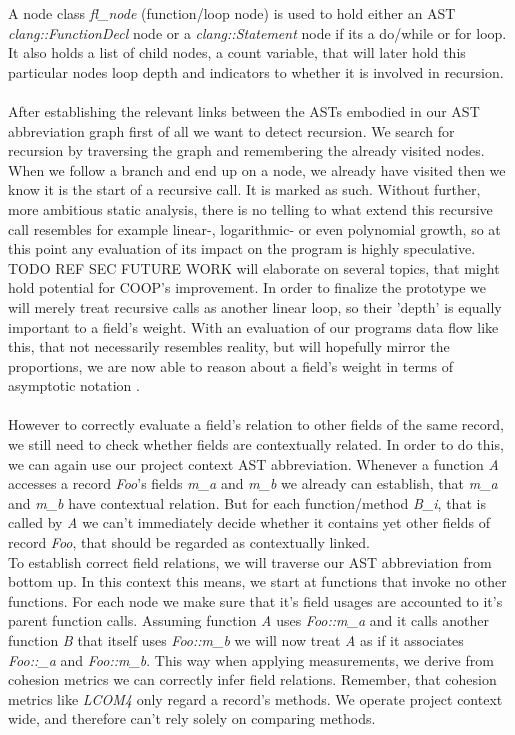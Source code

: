 A node class \textit{fl\_node} (function/loop node) is used to hold either an AST \textit{clang::FunctionDecl} node or a \textit{clang::Statement} node if its a do/while or for loop. It also holds a list of child nodes, a count variable, that will later hold this particular nodes loop depth and indicators to whether it is involved in recursion.\\\\
After establishing the relevant links between the ASTs embodied in our AST abbreviation graph first of all we want to detect recursion. We search for recursion by traversing the graph and remembering the already visited nodes. When we follow a branch and end up on a node, we already have visited then we know it is the start of a recursive call. It is marked as such. Without further, more ambitious static analysis, there is no telling to what extend this recursive call resembles for example linear-, logarithmic- or even polynomial growth, so at this point any evaluation of its impact on the program is highly speculative. TODO REF SEC FUTURE WORK  will elaborate on several topics, that might hold potential for COOP's improvement. In order to finalize the prototype we will merely treat recursive calls as another linear loop, so their 'depth' is equally important to a field's weight. With an evaluation of our programs data flow like this, that not necessarily resembles reality, but will hopefully mirror the proportions, we are now able to reason about a field's weight in terms of asymptotic notation .\\\\
However to correctly evaluate a field's relation to other fields of the same record, we still need to check whether fields are contextually related. In order to do this, we can again use our project context AST abbreviation. Whenever a function \textit{A} accesses a record \textit{Foo}'s fields \textit{m\_a} and \textit{m\_b} we already can establish, that \textit{m\_a} and \textit{m\_b} have contextual relation. But for each function/method \textit{B\_i}, that is called by \textit{A} we can't immediately decide whether it contains yet other fields of record \textit{Foo}, that should be regarded as contextually linked.\\
To establish correct field relations, we will traverse our AST abbreviation from bottom up. In this context this means, we start at functions that invoke no other functions. For each node we make sure that it's field usages are accounted to it's parent function calls. Assuming function \textit{A} uses \textit{Foo::m\_a} and it calls another function \textit{B} that itself uses \textit{Foo::m\_b} we will now treat \textit{A} as if it associates \textit{Foo::\_a} and \textit{Foo::m\_b}. This way when applying measurements, we derive from cohesion metrics  we can correctly infer field relations. Remember, that cohesion metrics like \textit{LCOM4} only regard a record's methods. We operate project context wide, and therefore can't rely solely on comparing methods.\\
